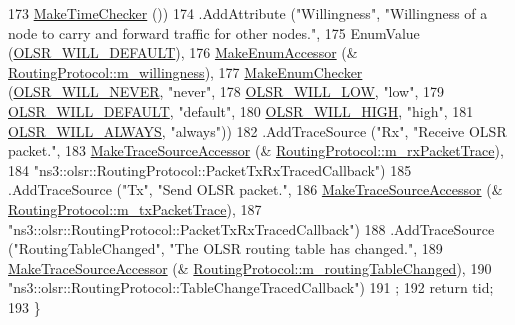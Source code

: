 \begin{DoxyCode}
173                    \hyperlink{group__time_ga7032965bd4afa578691d88c09e4481c1}{MakeTimeChecker} ())
174     .AddAttribute (\textcolor{stringliteral}{"Willingness"}, \textcolor{stringliteral}{"Willingness of a node to carry and forward traffic for other nodes."},
175                    EnumValue (\hyperlink{olsr-routing-protocol_8cc_a0b87d49ad8114eabe8dd6eecfb6858e1}{OLSR\_WILL\_DEFAULT}),
176                    \hyperlink{namespacens3_af5050739867ce63896dec011e332c8ec}{MakeEnumAccessor} (&
      \hyperlink{classns3_1_1olsr_1_1RoutingProtocol_a2e94c2954ffa92d1c7d3b627087c9430}{RoutingProtocol::m\_willingness}),
177                    \hyperlink{namespacens3_a48832781a2b521d3d0091e05ece30615}{MakeEnumChecker} (\hyperlink{olsr-routing-protocol_8cc_a146d2c103abd49bdfad44b4424769696}{OLSR\_WILL\_NEVER}, \textcolor{stringliteral}{"never"},
178                                     \hyperlink{olsr-routing-protocol_8cc_af5179e8ea62927c15150f279ce4bf0c7}{OLSR\_WILL\_LOW}, \textcolor{stringliteral}{"low"},
179                                     \hyperlink{olsr-routing-protocol_8cc_a0b87d49ad8114eabe8dd6eecfb6858e1}{OLSR\_WILL\_DEFAULT}, \textcolor{stringliteral}{"default"},
180                                     \hyperlink{olsr-routing-protocol_8cc_ac18eca80c0f239fb80d32461d51e3644}{OLSR\_WILL\_HIGH}, \textcolor{stringliteral}{"high"},
181                                     \hyperlink{olsr-routing-protocol_8cc_a47254d140ed26351d672c338a8cda435}{OLSR\_WILL\_ALWAYS}, \textcolor{stringliteral}{"always"}))
182     .AddTraceSource (\textcolor{stringliteral}{"Rx"}, \textcolor{stringliteral}{"Receive OLSR packet."},
183                      \hyperlink{group__tracing_gab21a770b9855af4e8f69f7531ea4a6b0}{MakeTraceSourceAccessor} (&
      \hyperlink{classns3_1_1olsr_1_1RoutingProtocol_a861b1d2ce370ab0137e67c5a1102a937}{RoutingProtocol::m\_rxPacketTrace}),
184                      \textcolor{stringliteral}{"ns3::olsr::RoutingProtocol::PacketTxRxTracedCallback"})
185     .AddTraceSource (\textcolor{stringliteral}{"Tx"}, \textcolor{stringliteral}{"Send OLSR packet."},
186                      \hyperlink{group__tracing_gab21a770b9855af4e8f69f7531ea4a6b0}{MakeTraceSourceAccessor} (&
      \hyperlink{classns3_1_1olsr_1_1RoutingProtocol_aadd8d4fea9a32b185bf23d787004de9d}{RoutingProtocol::m\_txPacketTrace}),
187                      \textcolor{stringliteral}{"ns3::olsr::RoutingProtocol::PacketTxRxTracedCallback"})
188     .AddTraceSource (\textcolor{stringliteral}{"RoutingTableChanged"}, \textcolor{stringliteral}{"The OLSR routing table has changed."},
189                      \hyperlink{group__tracing_gab21a770b9855af4e8f69f7531ea4a6b0}{MakeTraceSourceAccessor} (&
      \hyperlink{classns3_1_1olsr_1_1RoutingProtocol_a1cbaa4bdf90462b6d8e0ddc90eaa4130}{RoutingProtocol::m\_routingTableChanged}),
190                      \textcolor{stringliteral}{"ns3::olsr::RoutingProtocol::TableChangeTracedCallback"})
191   ;
192   \textcolor{keywordflow}{return} tid;
193 \}
\end{DoxyCode}


